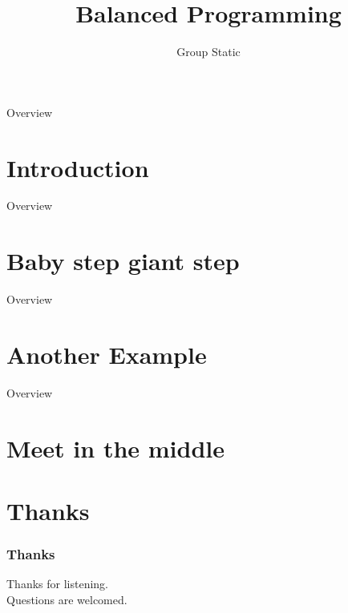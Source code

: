 \documentclass[landscape]{beamer}
\begin{document}
	\title{\textbf{Balanced Programming}}
	\author{Group Static}
	\maketitle
	\begin{frame}{Overview}
		\tableofcontents
	\end{frame}
	\section{Introduction}
	
	\begin{frame}{Overview}
		\tableofcontents
	\end{frame}
	\section{Baby step giant step}
	
	\begin{frame}{Overview}
		\tableofcontents
	\end{frame}
	\section{Another Example}
	
	\begin{frame}{Overview}
		\tableofcontents
	\end{frame}
	\section{Meet in the middle}
	
	\section*{Thanks}
	\begin{frame}
		\frametitle{Thanks}
		Thanks for listening.\\
		Questions are welcomed.
	\end{frame}
\end{document}
